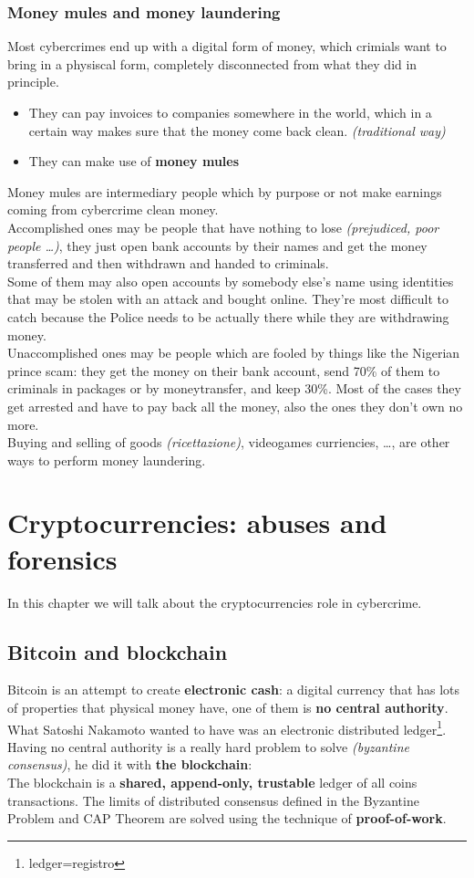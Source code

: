     \subsection{Money mules and money laundering}
        Most cybercrimes end up with a digital form of money, which crimials want to bring in a physiscal form, completely disconnected from what they did in principle.
        \begin{itemize}
            \item They can pay invoices to companies somewhere in the world, which in a certain way makes sure that the money come back clean. \textit{(traditional way)}
            \item They can make use of \textbf{money mules}
        \end{itemize}
        Money mules are intermediary people which by purpose or not make earnings coming from cybercrime clean money.\\
        Accomplished ones may be people that have nothing to lose \textit{(prejudiced, poor people \dots)}, they just open bank accounts by their names and get the money transferred and then withdrawn and handed to criminals.\\
        Some of them may also open accounts by somebody else's name using identities that may be stolen with an attack and bought online. They're most difficult to catch because the Police needs to be actually there while they are withdrawing money.
        \\Unaccomplished ones may be people which are fooled by things like the Nigerian prince scam: they get the money on their bank account, send 70\% of them to criminals in packages or by moneytransfer, and keep 30\%. Most of the cases they get arrested and have to pay back all the money, also the ones they don't own no more.\\
        Buying and selling of goods \textit{(ricettazione)}, videogames curriencies, \dots, are other ways to perform money laundering.
\chapter{Cryptocurrencies: abuses and forensics}
    In this chapter we will talk about the cryptocurrencies role in cybercrime.
    \section{Bitcoin and blockchain}
        Bitcoin is an attempt to create \textbf{electronic cash}: a digital currency that has lots of properties that physical money have, one of them is \textbf{no central authority}.\\
        What Satoshi Nakamoto wanted to have was an electronic distributed ledger\footnote{ledger=registro}.\\
        Having no central authority is a really hard problem to solve \textit{(byzantine consensus)}, he did it with \textbf{the blockchain}:\\
        The blockchain is a \textbf{shared, append-only, trustable} ledger of all coins transactions. The limits of distributed consensus defined in the Byzantine Problem and CAP Theorem are solved using the technique of \textbf{proof-of-work}.
